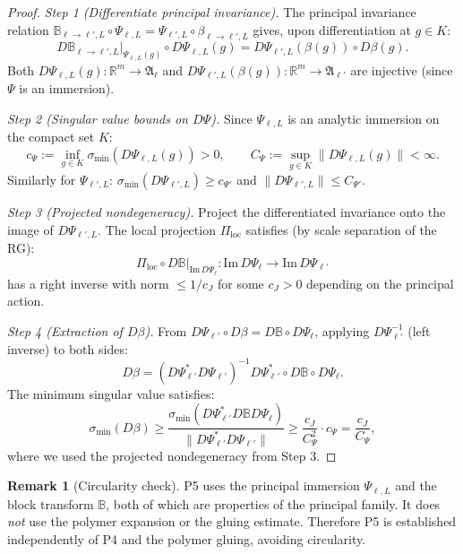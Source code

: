 \documentclass[12pt]{article}
\theoremstyle{plain}
\theoremstyle{definition}
\newtheorem{remark}[theorem]{Remark}
\numberwithin{equation}{section}
\newcommand{\R}{\mathbb{R}}
\newcommand{\fA}{\mathfrak{A}}
\newcommand{\loc}{\mathrm{loc}}
\begin{document}
\begin{proof}
\emph{Step 1 (Differentiate principal invariance).}
The principal invariance relation $\mathbb{B}_{\ell\to\ell',L}\circ\Psi_{\ell,L}=\Psi_{\ell',L}\circ\beta_{\ell\to\ell',L}$ gives, upon differentiation at $g\in K$:
\begin{equation}
D\mathbb{B}_{\ell\to\ell',L}|_{\Psi_{\ell,L}(g)}\circ D\Psi_{\ell,L}(g) = D\Psi_{\ell',L}(\beta(g))\circ D\beta(g).
\end{equation}
Both $D\Psi_{\ell,L}(g):\R^m\to\fA_\ell$ and $D\Psi_{\ell',L}(\beta(g)):\R^m\to\fA_{\ell'}$ are injective (since $\Psi$ is an immersion).

\emph{Step 2 (Singular value bounds on $D\Psi$).}
Since $\Psi_{\ell,L}$ is an analytic immersion on the compact set $K$:
\begin{equation}
c_\Psi := \inf_{g\in K}\sigma_{\min}(D\Psi_{\ell,L}(g)) > 0,\qquad C_\Psi := \sup_{g\in K}\|D\Psi_{\ell,L}(g)\| < \infty.
\end{equation}
Similarly for $\Psi_{\ell',L}$: $\sigma_{\min}(D\Psi_{\ell',L})\geq c_{\Psi'}$ and $\|D\Psi_{\ell',L}\|\leq C_{\Psi'}$.

\emph{Step 3 (Projected nondegeneracy).}
Project the differentiated invariance onto the image of $D\Psi_{\ell',L}$.  The local projection $\Pi_{\loc}$ satisfies (by scale separation of the RG):
\begin{equation}
\Pi_{\loc}\circ D\mathbb{B}|_{\mathrm{Im}\,D\Psi_\ell} : \mathrm{Im}\,D\Psi_\ell \to \mathrm{Im}\,D\Psi_{\ell'}
\end{equation}
has a right inverse with norm $\leq 1/c_J$ for some $c_J>0$ depending on the principal action.

\emph{Step 4 (Extraction of $D\beta$).}
From $D\Psi_{\ell'}\circ D\beta=D\mathbb{B}\circ D\Psi_\ell$, applying $D\Psi_{\ell'}^{-1}$ (left inverse) to both sides:
\begin{equation}
D\beta = (D\Psi_{\ell'}^*D\Psi_{\ell'})^{-1}D\Psi_{\ell'}^*\circ D\mathbb{B}\circ D\Psi_\ell.
\end{equation}
The minimum singular value satisfies:
\begin{equation}
\sigma_{\min}(D\beta) \geq \frac{\sigma_{\min}(D\Psi_{\ell'}^*D\mathbb{B}D\Psi_\ell)}{\|D\Psi_{\ell'}^*D\Psi_{\ell'}\|} \geq \frac{c_J}{C_\Psi^2}\cdot c_\Psi = \frac{c_J}{C_\Psi},
\end{equation}
where we used the projected nondegeneracy from Step 3.
\end{proof}

\begin{remark}[Circularity check]
P5 uses the principal immersion $\Psi_{\ell,L}$ and the block transform $\mathbb{B}$, both of which are properties of the principal family.  It does \emph{not} use the polymer expansion or the gluing estimate.  Therefore P5 is established independently of P4 and the polymer gluing, avoiding circularity.
\end{remark}
\end{document}
